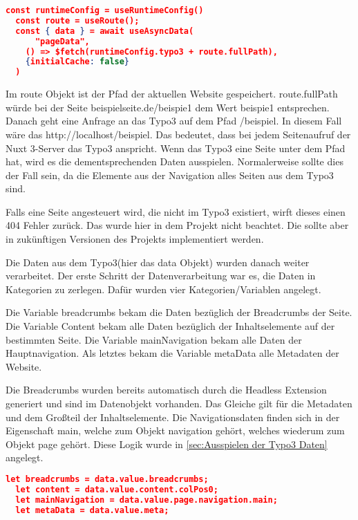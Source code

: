 \pagebreak

\begin{lstlisting}[language=json,firstnumber=1]
  const runtimeConfig = useRuntimeConfig()
  const route = useRoute();
  const { data } = await useAsyncData(
      "pageData",
    () => $fetch(runtimeConfig.typo3 + route.fullPath),
    {initialCache: false}
  )
\end{lstlisting}

Im route Objekt ist der Pfad der aktuellen Website gespeichert. route.fullPath würde bei der Seite beispielseite.de/beispie1 dem Wert beispie1 entsprechen. Danach geht eine Anfrage an das Typo3 auf dem Pfad /beispiel. In diesem Fall wäre das http://localhost/beispiel. Das bedeutet, dass bei jedem Seitenaufruf der Nuxt 3-Server das Typo3 anspricht. Wenn das Typo3 eine Seite unter dem Pfad hat, wird es die dementsprechenden Daten ausspielen. Normalerweise sollte dies der Fall sein, da die Elemente aus der Navigation alles Seiten aus dem Typo3 sind. 

Falls eine Seite angesteuert wird, die nicht im Typo3 existiert, wirft dieses einen 404 Fehler zurück. Das wurde hier in dem Projekt nicht beachtet. Die sollte aber in zukünftigen Versionen des Projekts implementiert werden.

Die Daten aus dem Typo3(hier das data Objekt) wurden danach weiter verarbeitet. Der erste Schritt der Datenverarbeitung war es, die Daten in Kategorien zu zerlegen. Dafür wurden vier Kategorien/Variablen angelegt. 

Die Variable breadcrumbs bekam die Daten bezüglich der Breadcrumbs der Seite. Die Variable Content bekam alle Daten bezüglich der Inhaltselemente auf der bestimmten Seite. Die Variable mainNavigation bekam alle Daten der Hauptnavigation. Als letztes bekam die Variable metaData alle Metadaten der Website. 

Die Breadcrumbs wurden bereits automatisch durch die Headless Extension generiert und sind im Datenobjekt vorhanden. Das Gleiche gilt für die Metadaten und dem Großteil der Inhaltselemente. Die Navigationsdaten finden sich in der Eigenschaft main, welche zum Objekt navigation gehört, welches wiederum zum Objekt page gehört. Diese Logik wurde in \ref{sec:Ausspielen der Typo3 Daten} angelegt.

\begin{lstlisting}[language=json,firstnumber=1]
  let breadcrumbs = data.value.breadcrumbs;
  let content = data.value.content.colPos0;
  let mainNavigation = data.value.page.navigation.main;
  let metaData = data.value.meta;
\end{lstlisting}


